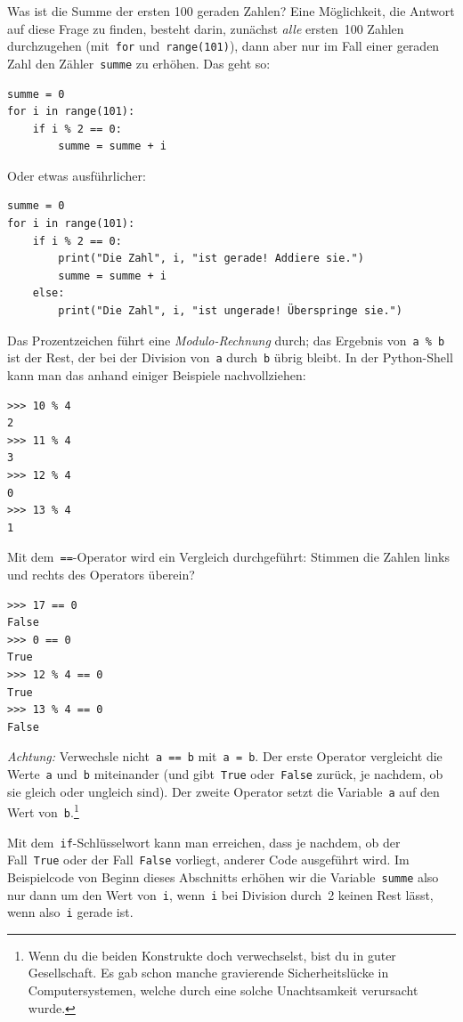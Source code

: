 \documentclass{blatt}
\begin{document}
Was ist die Summe der ersten 100 geraden Zahlen? Eine Möglichkeit, die Antwort
auf diese Frage zu finden, besteht darin, zunächst \emph{alle} ersten~100
Zahlen durchzugehen (mit~\texttt{for}
und~\texttt{range(101)}), dann aber nur im Fall einer geraden Zahl
den Zähler~\texttt{summe} zu erhöhen. Das geht so:
\begin{verbatim}
summe = 0
for i in range(101):
    if i % 2 == 0:
        summe = summe + i
\end{verbatim}
Oder etwas ausführlicher:
\begin{verbatim}
summe = 0
for i in range(101):
    if i % 2 == 0:
        print("Die Zahl", i, "ist gerade! Addiere sie.")
        summe = summe + i
    else:
        print("Die Zahl", i, "ist ungerade! Überspringe sie.")
\end{verbatim}
Das Prozentzeichen führt eine \emph{Modulo-Rechnung} durch; das Ergebnis
von~\texttt{a \% b} ist der Rest, der bei der Division
von~\texttt{a} durch~\texttt{b} übrig bleibt. In der
Python-Shell kann man das anhand einiger Beispiele nachvollziehen:
\begin{verbatim}
>>> 10 % 4
2
>>> 11 % 4
3
>>> 12 % 4
0
>>> 13 % 4
1
\end{verbatim}
Mit dem~\texttt{==}-Operator wird ein Vergleich durchgeführt:
Stimmen die Zahlen links und rechts des Operators überein?
\begin{verbatim}
>>> 17 == 0
False
>>> 0 == 0
True
>>> 12 % 4 == 0
True
>>> 13 % 4 == 0
False
\end{verbatim}
\emph{Achtung:} Verwechsle nicht~\texttt{a == b}
mit~\texttt{a = b}. Der erste Operator vergleicht die
Werte~\texttt{a} und~\texttt{b} miteinander (und
gibt~\texttt{True} oder~\texttt{False} zurück, je
nachdem, ob sie gleich oder ungleich sind). Der zweite Operator setzt die
Variable~\texttt{a} auf den Wert
von~\texttt{b}.\footnote{Wenn du die beiden Konstrukte doch
verwechselst, bist du in guter Gesellschaft. Es gab schon manche gravierende
Sicherheitslücke in Computersystemen, welche durch eine solche Unachtsamkeit
verursacht wurde.}

Mit dem~\texttt{if}-Schlüsselwort kann man erreichen, dass je
nachdem, ob der Fall~\texttt{True} oder der
Fall~\texttt{False} vorliegt, anderer Code ausgeführt wird.
Im Beispielcode von Beginn dieses Abschnitts erhöhen wir die
Variable~\texttt{summe} also nur dann um den Wert
von~\texttt{i}, wenn~\texttt{i} bei Division durch~2
keinen Rest lässt, wenn also~\texttt{i} gerade ist.
\end{document}
